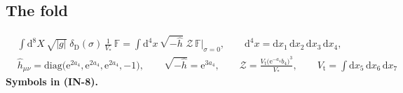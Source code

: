 \documentclass[
  10pt,
]{article}
\begin{document}
\hypertarget{the-fold}{%
\subsection{The fold}\label{the-fold}}

\[
\begin{aligned}
&\int\mathrm{d}^8X\,\sqrt{\lvert g\rvert}\;\delta_{\mathrm{D}}(\sigma)\,\frac{1}{V_*}\,\mathbb{F}
 = \int\mathrm{d}^4x\,\sqrt{-\hat h}\;\mathcal{Z}\,\mathbb{F}\big\vert_{\sigma=0},\qquad \mathrm{d}^4x = \mathrm{d}x_1\,\mathrm{d}x_2\,\mathrm{d}x_3\,\mathrm{d}x_4,\\
&\hat h_{\mu\nu} = \mathrm{diag}\big(\mathrm{e}^{2a_4}, \mathrm{e}^{2a_4}, \mathrm{e}^{2a_4}, -1\big),\qquad
 \sqrt{-\hat h} = \mathrm{e}^{3a_4},\qquad
 \mathcal{Z} = \frac{V_{\mathrm{t}}\big(\mathrm{e}^{-a_4}b_4\big)^3}{V_*},\qquad V_{\mathrm{t}} = \int\mathrm{d}x_5\,\mathrm{d}x_6\,\mathrm{d}x_7
\end{aligned} \tag{IN-8}
\] \textbf{Symbols in (IN-8).}
\end{document}

